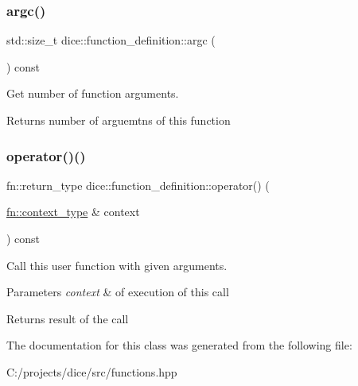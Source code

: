 \subsubsection{\texorpdfstring{argc()}{argc()}}
{\footnotesize\ttfamily std\+::size\+\_\+t dice\+::function\+\_\+definition\+::argc (\begin{DoxyParamCaption}{ }\end{DoxyParamCaption}) const\hspace{0.3cm}{\ttfamily [inline]}}



Get number of function arguments. 

\begin{DoxyReturn}{Returns}
number of arguemtns of this function 
\end{DoxyReturn}
\mbox{\label{classdice_1_1function__definition_ae88e53c3dca93ccf845ecb894db7672b}} 
\subsubsection{\texorpdfstring{operator()()}{operator()()}}
{\footnotesize\ttfamily fn\+::return\+\_\+type dice\+::function\+\_\+definition\+::operator() (\begin{DoxyParamCaption}\item[{\mbox{\hyperlink{classdice_1_1execution__context}{fn\+::context\+\_\+type}} \&}]{context }\end{DoxyParamCaption}) const\hspace{0.3cm}{\ttfamily [inline]}}



Call this user function with given arguments. 


\begin{DoxyParams}{Parameters}
{\em context} & of execution of this call\\
\hline
\end{DoxyParams}
\begin{DoxyReturn}{Returns}
result of the call 
\end{DoxyReturn}


The documentation for this class was generated from the following file\+:\begin{DoxyCompactItemize}
\item 
C\+:/projects/dice/src/functions.\+hpp\end{DoxyCompactItemize}
